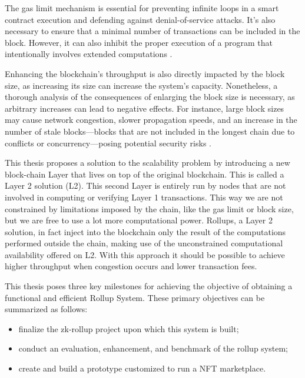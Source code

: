The gas limit mechanism is essential for preventing infinite loops in a smart contract execution and defending against denial-of-service attacks. It's also necessary to ensure that a minimal number of transactions can be included in the block. However, it can also inhibit the proper execution of a program that intentionally involves extended computations \cite{wood_ethereum_nodate}.

Enhancing the blockchain's throughput is also directly impacted by the block size, as increasing its size can increase the system's capacity. Nonetheless, a thorough analysis of the consequences of enlarging the block size is necessary, as arbitrary increases can lead to negative effects. For instance, large block sizes may cause network congestion, slower propagation speeds, and an increase in the number of stale blocks—blocks that are not included in the longest chain due to conflicts or concurrency—posing potential security risks \cite{gervais_security_2016}.

This thesis proposes a solution to the scalability problem by introducing a new block-chain Layer that lives on top of the original blockchain. This is called a Layer 2 solution (L2). This second Layer is entirely run by nodes that are not involved in computing or verifying Layer 1 transactions. This way we are not constrained by limitations imposed by the chain, like the gas limit or block size, but we are free to use a lot more computational power. Rollups, a Layer 2 solution, in fact inject into the blockchain only the result of the computations performed outside the chain, making use of the unconstrained computational availability offered on L2. With this approach it should be possible to achieve higher throughput when congestion occurs and lower transaction fees.

This thesis poses three key milestones for achieving the objective of obtaining a functional and efficient Rollup System. These primary objectives can be summarized as follows:
\begin{itemize}
    \vspace{-0.11in}
    \item finalize the zk-rollup project upon which this system is built;
          \vspace{-0.11in}
    \item conduct an evaluation, enhancement, and benchmark of the rollup system;
          \vspace{-0.11in}
    \item create and build a prototype customized to run a NFT marketplace.
\end{itemize}\

